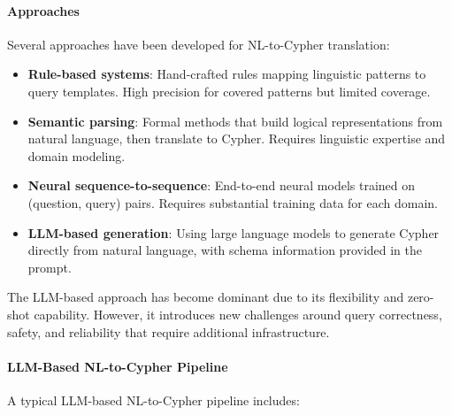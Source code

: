 \paragraph{Approaches}

Several approaches have been developed for NL-to-Cypher translation:

\begin{itemize}
    \item \textbf{Rule-based systems}: Hand-crafted rules mapping linguistic patterns to query templates. High precision for covered patterns but limited coverage.
    
    \item \textbf{Semantic parsing}: Formal methods that build logical representations from natural language, then translate to Cypher. Requires linguistic expertise and domain modeling.
    
    \item \textbf{Neural sequence-to-sequence}: End-to-end neural models trained on (question, query) pairs. Requires substantial training data for each domain.
    
    \item \textbf{LLM-based generation}: Using large language models to generate Cypher directly from natural language, with schema information provided in the prompt.
\end{itemize}

The LLM-based approach has become dominant due to its flexibility and zero-shot capability. However, it introduces new challenges around query correctness, safety, and reliability that require additional infrastructure.

\paragraph{LLM-Based NL-to-Cypher Pipeline}

A typical LLM-based NL-to-Cypher pipeline includes:

